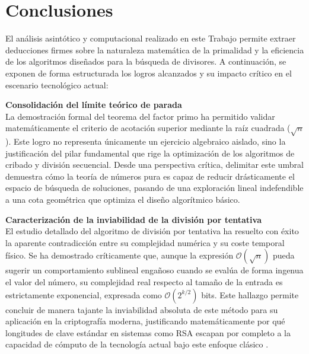 \documentclass[11pt,a4paper,spanish]{book}
\begin{document}
\chapter{Conclusiones}

El análisis asintótico y computacional realizado en este Trabajo permite extraer deducciones firmes sobre la naturaleza matemática de la primalidad y la eficiencia de los algoritmos diseñados para la búsqueda de divisores. A continuación, se exponen de forma estructurada los logros alcanzados y su impacto crítico en el escenario tecnológico actual:

\vspace{0.3cm}

\noindent \textbf{Consolidación del límite teórico de parada} \\
La demostración formal del teorema del factor primo ha permitido validar matemáticamente el criterio de acotación superior mediante la raíz cuadrada ($\sqrt{n}$). Este logro no representa únicamente un ejercicio algebraico aislado, sino la justificación del pilar fundamental que rige la optimización de los algoritmos de cribado y división secuencial. Desde una perspectiva crítica, delimitar este umbral demuestra cómo la teoría de números pura es capaz de reducir drásticamente el espacio de búsqueda de soluciones, pasando de una exploración lineal indefendible a una cota geométrica que optimiza el diseño algorítmico básico.

\vspace{0.3cm}

\noindent \textbf{Caracterización de la inviabilidad de la división por tentativa} \\
El estudio detallado del algoritmo de división por tentativa ha resuelto con éxito la aparente contradicción entre su complejidad numérica y su coste temporal físico. Se ha demostrado críticamente que, aunque la expresión $\mathcal{O}(\sqrt{n})$ pueda sugerir un comportamiento sublineal engañoso cuando se evalúa de forma ingenua el valor del número, su complejidad real respecto al tamaño de la entrada es estrictamente exponencial, expresada como $\mathcal{O}(2^{k/2})$ bits. Este hallazgo permite concluir de manera tajante la inviabilidad absoluta de este método para su aplicación en la criptografía moderna, justificando matemáticamente por qué longitudes de clave estándar en sistemas como RSA escapan por completo a la capacidad de cómputo de la tecnología actual bajo este enfoque clásico \citep{rivest1978}.
\vspace{0.3cm}
\end{document}
